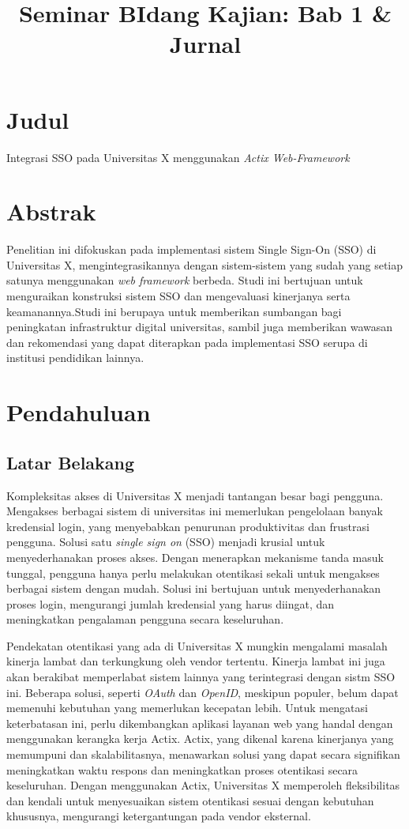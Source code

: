 \documentclass{article}
\title{Seminar BIdang Kajian: Bab 1 & Jurnal }
\begin{document}
\section*{Judul}
Integrasi SSO pada Universitas X menggunakan \emph{Actix Web-Framework}
\section*{Abstrak}
Penelitian ini difokuskan pada implementasi sistem Single Sign-On (SSO) di Universitas X, mengintegrasikannya dengan sistem-sistem yang sudah yang setiap satunya menggunakan \emph{web framework} berbeda. Studi ini bertujuan untuk menguraikan konstruksi sistem SSO dan mengevaluasi kinerjanya serta keamanannya.Studi ini berupaya untuk memberikan sumbangan bagi peningkatan infrastruktur digital universitas, sambil juga memberikan wawasan dan rekomendasi yang dapat diterapkan pada implementasi SSO serupa di institusi pendidikan lainnya.

\section{Pendahuluan}
\subsection{Latar Belakang}

Kompleksitas akses di Universitas X menjadi tantangan besar bagi pengguna. Mengakses berbagai sistem di universitas ini memerlukan pengelolaan banyak kredensial login, yang menyebabkan penurunan produktivitas dan frustrasi pengguna. Solusi satu \emph{single sign on} (SSO) menjadi krusial untuk menyederhanakan proses akses. Dengan menerapkan mekanisme tanda masuk tunggal, pengguna hanya perlu melakukan otentikasi sekali untuk mengakses berbagai sistem dengan mudah. Solusi ini bertujuan untuk menyederhanakan proses login, mengurangi jumlah kredensial yang harus diingat, dan meningkatkan pengalaman pengguna secara keseluruhan.

Pendekatan otentikasi yang ada di Universitas X mungkin mengalami masalah kinerja lambat dan terkungkung oleh vendor tertentu. Kinerja lambat ini juga akan berakibat memperlabat sistem lainnya yang terintegrasi dengan  sistm SSO ini. Beberapa solusi, seperti \emph{OAuth} dan \emph{OpenID}, meskipun populer, belum dapat memenuhi kebutuhan yang memerlukan kecepatan lebih. Untuk mengatasi keterbatasan ini, perlu dikembangkan aplikasi layanan web yang handal dengan menggunakan kerangka kerja Actix. Actix, yang dikenal karena kinerjanya yang memumpuni dan skalabilitasnya, menawarkan solusi yang dapat secara signifikan meningkatkan waktu respons dan meningkatkan proses otentikasi secara keseluruhan. Dengan menggunakan Actix, Universitas X memperoleh fleksibilitas dan kendali untuk menyesuaikan sistem otentikasi sesuai dengan kebutuhan khususnya, mengurangi ketergantungan pada vendor eksternal.
\end{document}
